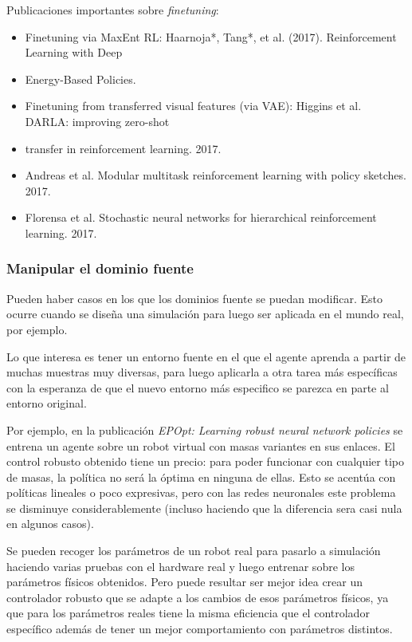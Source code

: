 Publicaciones importantes sobre \textit{finetuning}:
\begin{itemize}
    \item Finetuning via MaxEnt RL: Haarnoja*, Tang*, et al. (2017). Reinforcement Learning with Deep
    \item Energy-Based Policies.
    \item Finetuning from transferred visual features (via VAE): Higgins et al. DARLA: improving zero-shot
    \item transfer in reinforcement learning. 2017.
    \item Andreas et al. Modular multitask reinforcement learning with policy sketches. 2017.
    \item Florensa et al. Stochastic neural networks for hierarchical reinforcement learning. 2017.
\end{itemize}

\subsubsection{Manipular el dominio fuente}%
\label{ssub:manipular_el_dominio_fuente}

Pueden haber casos en los que los dominios fuente se puedan modificar. Esto ocurre cuando se
diseña una simulación para luego ser aplicada en el mundo real, por ejemplo.

Lo que interesa es tener un entorno fuente en el que el agente aprenda a partir de muchas
muestras muy diversas, para luego aplicarla a otra tarea más específicas con la esperanza de que
el nuevo entorno más especifico se parezca en parte al entorno original.

Por ejemplo, en la publicación \textit{EPOpt: Learning robust neural network policies} se entrena
un agente sobre un robot virtual con masas variantes en sus enlaces. El control robusto
obtenido tiene un precio: para poder funcionar con cualquier tipo de masas, la política no será
la óptima en ninguna de ellas. Esto se acentúa con políticas lineales o poco expresivas, pero con
las redes neuronales este problema se disminuye considerablemente (incluso haciendo que la
diferencia sera casi nula en algunos casos).

Se pueden recoger los parámetros de un robot real para pasarlo a simulación haciendo varias
pruebas con el hardware real y luego entrenar sobre los parámetros físicos obtenidos. Pero
puede resultar ser mejor idea crear un controlador robusto que se adapte a los cambios de esos
parámetros físicos, ya que para los parámetros reales tiene la misma eficiencia que el
controlador específico además de tener un mejor comportamiento con parámetros
distintos.

